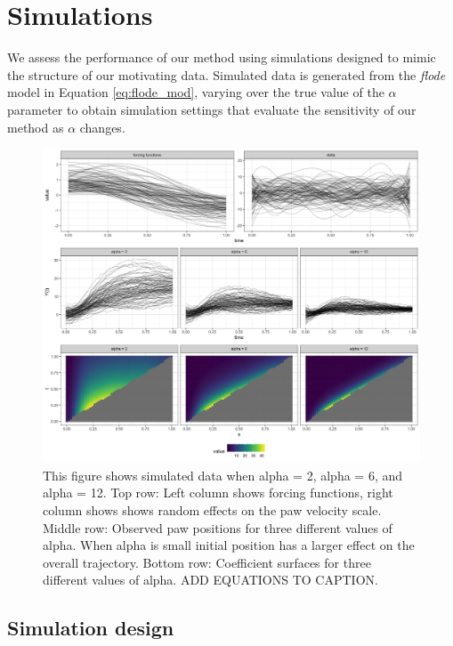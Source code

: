 \documentclass[preprint]{JASA}
\begin{document}
\hypertarget{simulations}{%
\section{Simulations}\label{simulations}}

\label{sec:simulations}

We assess the performance of our method using simulations designed to
mimic the structure of our motivating data. Simulated data is generated
from the \emph{flode} model in Equation \ref{eq:flode_mod}, varying over
the true value of the \(\alpha\) parameter to obtain simulation settings
that evaluate the sensitivity of our method as \(\alpha\) changes.

\begin{figure}
\includegraphics[width=\reprintcolumnwidth]{figs/fig_simdata_RE-1} \caption{This figure shows simulated data when alpha = 2, alpha = 6, and alpha = 12. Top row: Left column shows forcing functions, right column shows shows random effects on the paw velocity scale. Middle row: Observed paw positions for three different values of alpha. When alpha is small initial position has a larger effect on the overall trajectory.  Bottom row: Coefficient surfaces for three different values of alpha.  ADD EQUATIONS TO CAPTION.}\label{fig:sim_data}
\end{figure}

\hypertarget{simulation-design}{%
\subsection{Simulation design}\label{simulation-design}}
\end{document}
